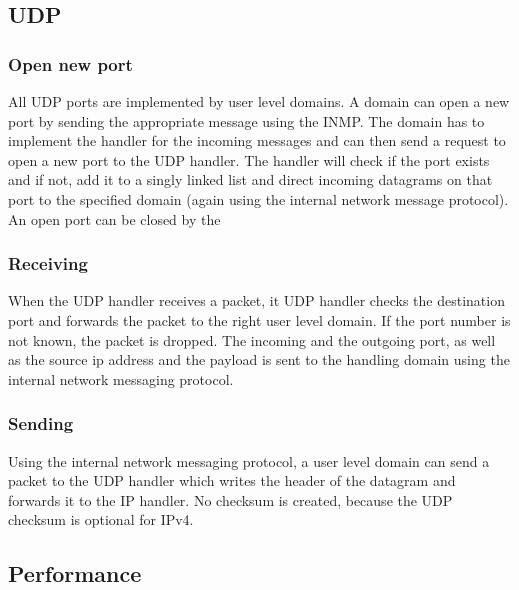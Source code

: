 \subsection{UDP}
\subsubsection{Open new port}
All UDP ports are implemented by user level domains. A domain can open a new port by sending the appropriate message using the INMP. The domain has to implement the handler for the incoming messages and can then send a request to open a new port to the UDP handler. The handler will check if the port exists and if not, add it to a singly linked list and direct incoming datagrams on that port to the specified domain (again using the internal network message protocol). An open port can be closed by the 

\subsubsection{Receiving}
When the UDP handler receives a packet, it UDP handler checks the destination port and forwards the packet to the right user level domain. If the port number is not known, the packet is dropped. The incoming and the outgoing port, as well as the source ip address and the payload is sent to the handling domain using the internal network messaging protocol.
\subsubsection{Sending}
Using the internal network messaging protocol, a user level domain can send a packet to the UDP handler which writes the header of the datagram and forwards it to the IP handler. No checksum is created, because the UDP checksum is optional for IPv4. 

\subsection{Performance}

